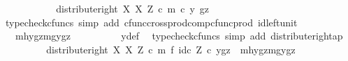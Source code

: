 \begin{isabellebody}
\ \ \ \ \ \ \isamarkupfalse%
\ \isamarkupfalse%
\ {\isachardoublequoteopen}{\isachardot}{\kern0pt}{\isachardot}{\kern0pt}{\isachardot}{\kern0pt}\ {\isacharequal}{\kern0pt}\ distribute{\isacharunderscore}{\kern0pt}right\ X\ X\ Z\ {\isasymcirc}\isactrlsub c\ {\isasymlangle}m\ {\isasymcirc}\isactrlsub c\ y{\isacharcomma}{\kern0pt}\ gz{\isasymrangle}{\isachardoublequoteclose}\isanewline
\ \ \ \ \ \ \ \ \isamarkupfalse%
\ {\isacharparenleft}{\kern0pt}typecheck{\isacharunderscore}{\kern0pt}cfuncs{\isacharcomma}{\kern0pt}\ simp\ add{\isacharcolon}{\kern0pt}\ cfunc{\isacharunderscore}{\kern0pt}cross{\isacharunderscore}{\kern0pt}prod{\isacharunderscore}{\kern0pt}comp{\isacharunderscore}{\kern0pt}cfunc{\isacharunderscore}{\kern0pt}prod\ id{\isacharunderscore}{\kern0pt}left{\isacharunderscore}{\kern0pt}unit{}{\isacharparenright}{\kern0pt}\isanewline
\ \ \ \ \ \ \isamarkupfalse%
\ \isamarkupfalse%
\ {\isachardoublequoteopen}{\isachardot}{\kern0pt}{\isachardot}{\kern0pt}{\isachardot}{\kern0pt}\ {\isacharequal}{\kern0pt}\ {\isasymlangle}{\isasymlangle}mhy{}{\isacharcomma}{\kern0pt}gz{\isasymrangle}{\isacharcomma}{\kern0pt}{\isasymlangle}mgy{}{\isacharcomma}{\kern0pt}gz{\isasymrangle}{\isasymrangle}{\isachardoublequoteclose}\isanewline
\ \ \ \ \ \ \ \ \isamarkupfalse%
\ y{\isacharunderscore}{\kern0pt}def\ \isamarkupfalse%
\ {\isacharparenleft}{\kern0pt}typecheck{\isacharunderscore}{\kern0pt}cfuncs{\isacharcomma}{\kern0pt}\ simp\ add{\isacharcolon}{\kern0pt}\ distribute{\isacharunderscore}{\kern0pt}right{\isacharunderscore}{\kern0pt}ap{\isacharparenright}{\kern0pt}\isanewline
\ \ \ \ \ \ \isamarkupfalse%
\ \isamarkupfalse%
\ {\isachardoublequoteopen}{\isacharparenleft}{\kern0pt}distribute{\isacharunderscore}{\kern0pt}right\ X\ X\ Z\ {\isasymcirc}\isactrlsub c\ m\ {\isasymtimes}\isactrlsub f\ id\isactrlsub c\ Z{\isacharparenright}{\kern0pt}\ {\isasymcirc}\isactrlsub c\ {\isasymlangle}y{\isacharcomma}{\kern0pt}gz{\isasymrangle}\ {\isacharequal}{\kern0pt}\ {\isasymlangle}{\isasymlangle}mhy{}{\isacharcomma}{\kern0pt}gz{\isasymrangle}{\isacharcomma}{\kern0pt}{\isasymlangle}mgy{}{\isacharcomma}{\kern0pt}gz{\isasymrangle}{\isasymrangle}{\isachardoublequoteclose}\isacommand{{\isachardot}{\kern0pt}}\isamarkupfalse%
\isanewline
\ \ \ \ \isamarkupfalse%
\isanewline
\ \ \isamarkupfalse%
\isanewline
{}\isamarkupfalse%
%
\endisatagproof

\end{isabellebody}
